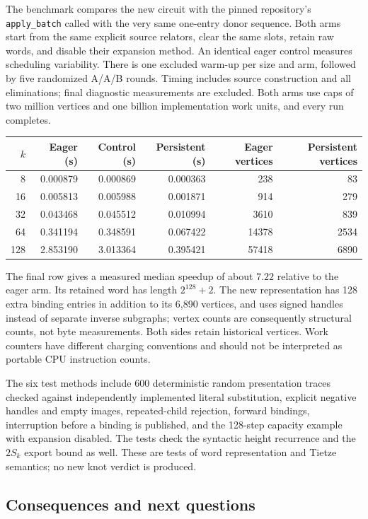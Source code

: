 The benchmark compares the new circuit with the pinned repository's
\texttt{apply\_batch} called with the very same one-entry donor sequence.
Both arms start from the same explicit source relators, clear the same
slots, retain raw words, and disable their expansion method. An identical
eager control measures scheduling variability. There is one excluded
warm-up per size and arm, followed by five randomized A/A/B rounds.
Timing includes source construction and all eliminations; final diagnostic
measurements are excluded. Both arms use caps of two million vertices
and one billion implementation work units, and every run completes.

\begin{center}
\begin{tabular}{r|rrr|rr}
 $k$ & Eager (s) & Control (s) & Persistent (s)
     & Eager vertices & Persistent vertices\\\hline
 8   & 0.000879 & 0.000869 & 0.000363 & 238 & 83\\
 16  & 0.005813 & 0.005988 & 0.001871 & 914 & 279\\
 32  & 0.043468 & 0.045512 & 0.010994 & 3610 & 839\\
 64  & 0.341194 & 0.348591 & 0.067422 & 14378 & 2534\\
 128 & 2.853190 & 3.013364 & 0.395421 & 57418 & 6890
\end{tabular}
\end{center}
The final row gives a measured median speedup of about $7.22$ relative
to the eager arm. Its retained word has length $2^{128}+2$. The new
representation has 128 extra binding entries in addition to its 6,890
vertices, and uses signed handles instead of separate inverse subgraphs;
vertex counts are consequently structural counts, not byte measurements.
Both sides retain historical vertices. Work counters have different
charging conventions and should not be interpreted as portable CPU
instruction counts.

The six test methods include 600 deterministic random presentation traces
checked against independently implemented literal substitution, explicit
negative handles and empty images, repeated-child rejection, forward
bindings, interruption before a binding is published, and the 128-step
capacity example with expansion disabled. The tests check the syntactic
height recurrence and the $2S_k$ export bound as well. These are tests of
word representation and Tietze semantics; no new knot verdict is produced.

\subsection{Consequences and next questions}

